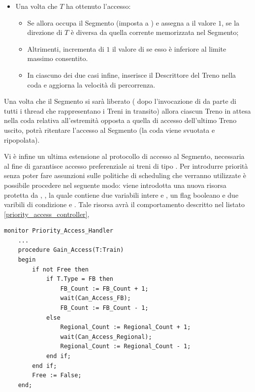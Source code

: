 \begin{description}
\begin{itemize}
\begin{lstlisting}[caption=\small{Procedura protetta \ttt{Enter\_Monitor} per l'accesso al Segmento.},label=code:segment_monitor_enter]
				((not Free) and 
				 (Access_End /= Current_Direction)) or 
				((not Free) and
				 (Access_End = Current_Direction) and 
				 (Access_Number = MAX) and 
				 (First_End_Count > 0)) loop
				wait(Can_Enter_Second_End);
			end loop;
		end if;
		// A questo punto il Treno puo' accedere.
		...
	end;
...	
end monitor;
\end{lstlisting}
			\item Una volta che $T$ ha ottenuto l'accesso:
				\begin{itemize}
					\item Se  allora occupa il Segmento (imposta  a ) e assegna a  il valore $1$, se la direzione di $T$ è diversa da quella corrente memorizzata nel Segmento;
					\item Altrimenti, incrementa di $1$ il valore di  se esso è inferiore al limite massimo consentito.
					\item In ciascuno dei due casi infine, inserisce il Descrittore del Treno nella coda  e aggiorna la velocità di percorrenza.
				\end{itemize}
		\end{itemize}
			
			Una volta che il Segmento si sarà liberato ( dopo l'invocazione di  da parte di tutti i thread che rappresentano i Treni in transito) allora ciascun Treno in attesa nella coda relativa all'estremità opposta a quella di accesso dell'ultimo Treno uscito, potrà ritentare l'accesso al Segmento (la coda viene svuotata e ripopolata).
			
			Vi è infine un ultima estensione al protocollo di accesso al Segmento, necessaria al fine di garantisce accesso preferenziale ai treni di tipo . Per introdurre priorità senza poter fare assunzioni sulle politiche di scheduling che verranno utilizzate è possibile procedere nel seguente modo: viene introdotta una nuova risorsa protetta da , , la quale contiene due variabili intere  e , un flag booleano  e due varibili di condizione  e . Tale risorsa avrà il comportamento descritto nel listato \ref{priority_access_controller},
	
\begin{lstlisting}[caption=\small{monitor utilizzato per garantire accesso preferenziale a Treni di tipo \ttt{FB}.}, label=priority_access_controller]
monitor Priority_Access_Handler 
	...
	procedure Gain_Access(T:Train) 
	begin
		if not Free then
			if T.Type = FB then
				FB_Count := FB_Count + 1;
				wait(Can_Access_FB);
				FB_Count := FB_Count - 1;
			else
				Regional_Count := Regional_Count + 1;
				wait(Can_Access_Regional);
				Regional_Count := Regional_Count - 1;
			end if;
		end if;
		Free := False;
	end;
	

\end{lstlisting}
\end{description}
